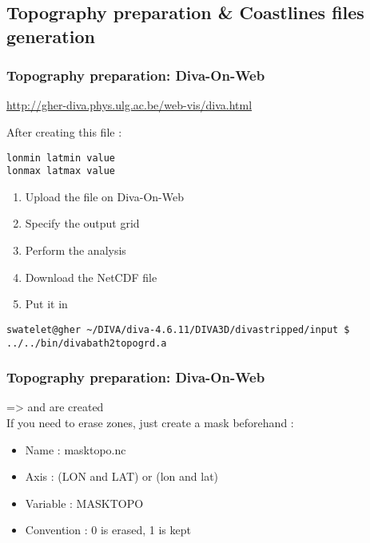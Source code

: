 \subsection{Topography preparation \& Coastlines files generation}

\begin{frame}[fragile]
\frametitle{Topography preparation: Diva-On-Web}

\url{http://gher-diva.phys.ulg.ac.be/web-vis/diva.html}

After creating this file :

\begin{verbatim}
lonmin latmin value
lonmax latmax value
\end{verbatim}

\begin{enumerate}
\item Upload the file on Diva-On-Web
\item Specify the output grid
\item Perform the analysis
\item Download the NetCDF file 
\item Put it in 
\end{enumerate}

\begin{lstlisting}[style=Bash]
swatelet@gher ~/DIVA/diva-4.6.11/DIVA3D/divastripped/input $ ../../bin/divabath2topogrd.a
\end{lstlisting}

\end{frame}


\begin{frame}[fragile]
\frametitle{Topography preparation: Diva-On-Web}

=>  and  are created \\
\vspace{5mm}
If you need to erase zones, just create a mask beforehand :

\begin{itemize}
\item Name : masktopo.nc
\item Axis : (LON and LAT) or (lon and lat)
\item Variable : MASKTOPO
\item Convention : 0 is erased, 1 is kept
\end{itemize}

\end{frame}

